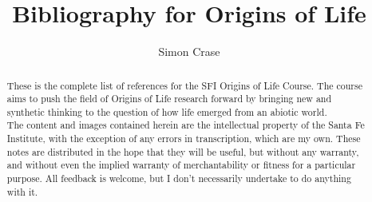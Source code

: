 \documentclass[]{article}
\title{
	Bibliography for Origins of Life
}
\author{Simon Crase}
\begin{document}
\maketitle

\begin{abstract}
	These is the complete list of references for the SFI Origins of Life Course. The course aims to push the field of Origins of Life research forward by bringing new and synthetic thinking to the question of how life emerged from an abiotic world.\\
	The content and images contained herein are the intellectual property of the Santa Fe Institute, with the exception of any errors in transcription, which are my own.
	These notes are distributed in the hope that they will be useful,
	but without any warranty, and without even the implied warranty of
	merchantability or fitness for a particular purpose. All feedback is welcome,
	but I don't necessarily undertake to do anything with it.
\end{abstract}

\nocite{*}


\end{document}

